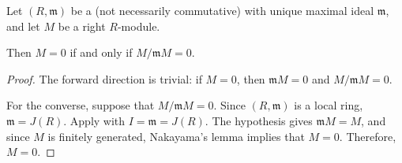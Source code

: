 \begin{corollary}  \label{corollary:nakayamas_lemma_for_finitely_generated_modules_over_a_local_ring_is_vanishing_iff_quotient_by_maximal_ideal}
	Let $(R, \mathfrak{m})$ be a  (not necessarily commutative) with unique maximal ideal $\mathfrak{m}$, and let $M$ be a  right $R$-module.

	Then $M = 0$ if and only if $M/\mathfrak{m}M = 0$.
\end{corollary}
\begin{proof}
	The forward direction is trivial: if $M = 0$, then $\mathfrak{m}M = 0$ and $M/\mathfrak{m}M = 0$.

	For the converse, suppose that $M/\mathfrak{m}M = 0$. Since $(R, \mathfrak{m})$ is a local ring, $\mathfrak{m} = J(R)$. Apply  with $I = \mathfrak{m} = J(R)$. The hypothesis gives $\mathfrak{m}M = M$, and since $M$ is finitely generated, Nakayama's lemma implies that $M = 0$. Therefore, $M = 0$.
\end{proof}
